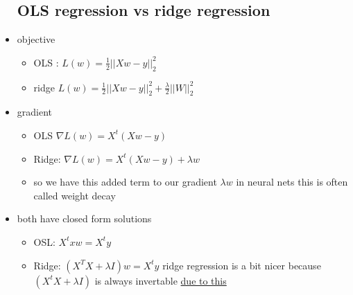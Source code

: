 \documentclass{article}
\begin{document}
\begin{itemize}
\subsection{OLS regression vs ridge regression}
\item objective
\begin{itemize}
    \item OLS : $L(w)=\frac{1}{2}||Xw-y||_{2}^{2}$
    \item ridge $L(w)=\frac{1}{2}||Xw-y||_{2}^{2}+\frac{\lambda }{2}||W||_{2}^{2}$
\end{itemize}
\item gradient 
\begin{itemize}
    \item OLS $\nabla L(w)=X^{t}(Xw-y)$
    \item Ridge: $\nabla L(w)=X^{t}(Xw-y)+\lambda w$
    \item so we have this added term to our gradient $\lambda w$ in neural nets this is often called weight decay
\end{itemize}
\item both have closed form solutions
\begin{itemize}
    \item OSL: $X^{t}xw=X^{t}y$
    \item Ridge: $(X^{T}X+\lambda I)w=X^{t}y$ ridge regression  is a bit nicer because $(X^{t}X+\lambda I)$ is always invertable \href{https://math.stackexchange.com/questions/1647625/when-is-mathbfxt-mathbfx-lambda-mathbfi-invertible}{due to this}
\end{itemize}

\end{itemize}
\end{document}
